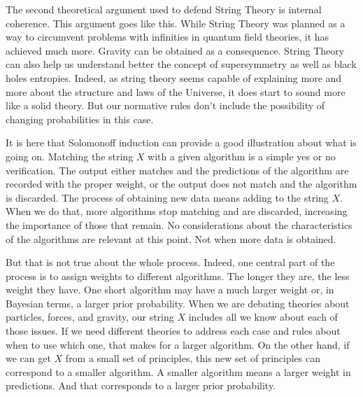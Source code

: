 \documentclass{article}
\begin{document}
	
	The second theoretical argument used to defend String Theory is internal coherence. This argument goes like this. While String Theory was planned as a way to circumvent problems with infinities in quantum field theories, it has achieved much more. Gravity can be obtained as a consequence. String Theory can also help us understand better the concept of supersymmetry as well as black holes entropies. Indeed, as string theory seems capable of explaining more  and more about the structure and laws of the Universe, it does start to sound more like a solid theory. But our normative rules don't include the possibility of changing probabilities in this case.
	
	
	It is here that Solomonoff induction can provide a good illustration about what is going on. Matching the string $X$ with a given algorithm is a simple yes or no verification. The output either matches and the predictions of the algorithm are recorded with the proper weight, or the output does not match and the algorithm is discarded. The process of obtaining new data means adding to the string $X$. When we do that, more algorithms stop matching and are discarded, increasing the importance of those that remain. No considerations about the characteristics of the algorithms  are relevant at this point. Not when more data is obtained.
	
	
	But that is not true about the whole process. Indeed, one central part of the process is to assign weights to different algorithms. The longer they are, the less weight they have. One short algorithm may have a much larger weight or, in Bayesian terms, a larger prior probability. When we are debating theories about particles, forces, and gravity, our string $X$ includes all we know about each of those issues. If we need different theories to address each case and rules about when to use which one, that makes for a larger algorithm. On the other hand, if we can get $X$ from a small set of principles, this new set of principles can correspond to a smaller algorithm. A smaller algorithm means a larger weight in predictions. And that corresponds to a larger prior probability. 
	
\end{document}
